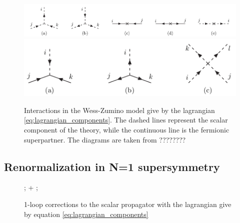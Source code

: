 \documentclass[12pt]{article}
\begin{document}
\begin{figure}[h]
  \centering 
  \includegraphics[scale=0.3]{images/feynman1.png}
  \includegraphics[scale=0.3]{images/feynman2.png}
  \caption{Interactions in the Wess-Zumino model give by the lagrangian \ref{eq:lagrangian_components}. The dashed lines represent the scalar component of the theory, while the continuous line is the fermionic superpartner. The diagrams are taken from ????????}
  \label{fig:WZ_interactions}
\end{figure}
\par 

\newpage

\subsection*{Renormalization in N=1 supersymmetry}

\begin{figure}[h]
  \centering
  ; 
\quad + \qquad
{};
\caption{1-loop corrections to the scalar propagator with the lagrangian give by equation \ref{eq:lagrangian_components}}
\label{fig:scalar_mass_renormalization}
\end{figure}
\end{document}
